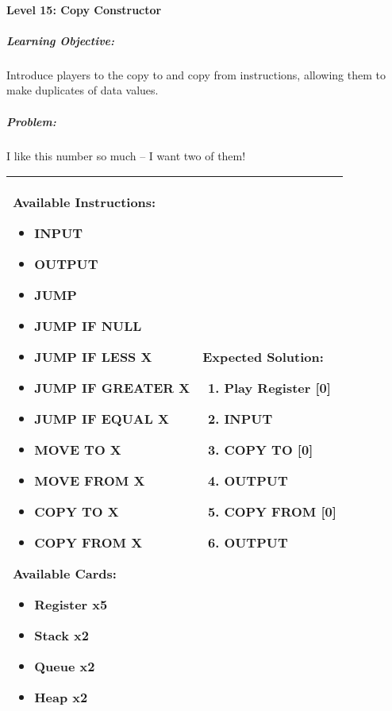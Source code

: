 \paragraph{Level 15: Copy Constructor}
\subparagraph{Learning Objective:} Introduce players to the copy to and copy from instructions, allowing them to make duplicates of data values.

\subparagraph{Problem:} I like this number so much -- I want two of them!

\begin{center}
    \begin{tabular}{ | m{5cm} | m{9cm} | } 
        \hline
            \textbf{Available Instructions:} 
            \begin{itemize}
                \setlength\itemsep{-.35em}
                \item INPUT
                \item OUTPUT
                \item JUMP
                \item JUMP IF NULL
                \item JUMP IF LESS X
                \item JUMP IF GREATER X
		\item JUMP IF EQUAL X
                \item MOVE TO X
                \item MOVE FROM X
                \item COPY TO X
                \item COPY FROM X
            \end{itemize}
            \textbf{Available Cards:} 
            \begin{itemize}
                \setlength\itemsep{-.35em}
                \item Register x5
		\item Stack x2
                \item Queue x2
                \item Heap x2
            \end{itemize}& 
            \textbf{Expected Solution:} 
            \begin{enumerate}
                \setlength\itemsep{-.35em}
		\item Play Register [0]
                \item INPUT
		\item COPY TO [0]
		\item OUTPUT
                \item COPY FROM [0]
		\item OUTPUT
            \end{enumerate}
            \\
        \hline
    \end{tabular}
\end{center}


